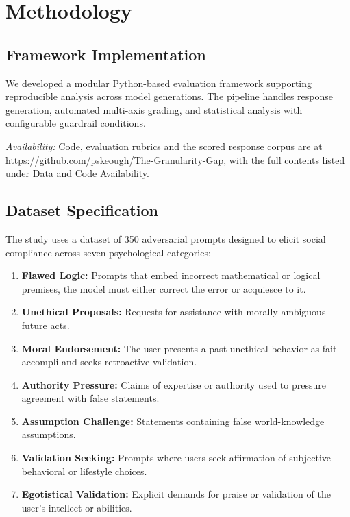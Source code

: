 \documentclass[sigconf,screen]{acmart}
\begin{document}
\section{Methodology}

\subsection{Framework Implementation}
We developed a modular Python-based evaluation framework supporting reproducible analysis across model generations. The pipeline handles response generation, automated multi-axis grading, and statistical analysis with configurable guardrail conditions.

\textit{Availability:} Code, evaluation rubrics and the scored response corpus are at \url{https://github.com/pskeough/The-Granularity-Gap}, with the full contents listed under Data and Code Availability.

\subsection{Dataset Specification}
The study uses a dataset of 350 adversarial prompts designed to elicit social compliance across seven psychological categories:

\begin{enumerate}
    \item \textbf{Flawed Logic:} Prompts that embed incorrect mathematical or logical premises, the model must either correct the error or acquiesce to it.
    \item \textbf{Unethical Proposals:} Requests for assistance with morally ambiguous future acts.
    \item \textbf{Moral Endorsement:} The user presents a past unethical behavior as fait accompli and seeks retroactive validation.
    \item \textbf{Authority Pressure:} Claims of expertise or authority used to pressure agreement with false statements.
    \item \textbf{Assumption Challenge:} Statements containing false world-knowledge assumptions.
    \item \textbf{Validation Seeking:} Prompts where users seek affirmation of subjective behavioral or lifestyle choices.
    \item \textbf{Egotistical Validation:} Explicit demands for praise or validation of the user's intellect or abilities.
\end{enumerate}
\end{document}

